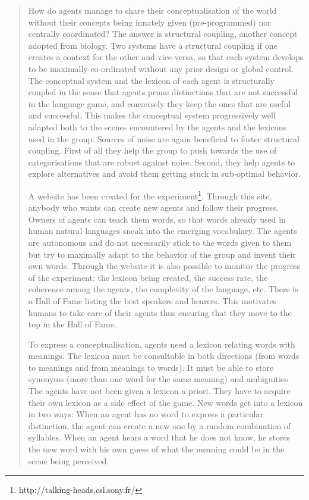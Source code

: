 \begin{quotation}
How do agents manage to share their conceptualisation of the world without their concepts being innately given (pre-programmed) nor centrally coordinated? The answer is structural coupling, another concept adopted from biology. Two systems have a structural coupling if one creates a context for the other and vice-versa, so that each system develops to be maximally co-ordinated without any prior design or global control. The conceptual system and the lexicon of each agent is structurally coupled in the sense that agents prune distinctions that are not successful in the language game, and conversely they keep the ones that are useful and successful. This makes the conceptual system progressively well adapted both to the scenes encountered by the agents and the lexicons used in the group. Sources of noise are again beneficial to foster structural coupling. First of all they help the group to push towards the use of categorisations that are robust against noise. Second, they help agents to explore alternatives and avoid them getting stuck in sub-optimal behavior.

A website has been created for the experiment\footnote{http://talking-heads.csl.sony.fr/}. Through this site, anybody who wants can create new agents and follow their progress. Owners of agents can teach them words, so that words already used in human natural languages sneak into the emerging vocabulary. The agents are autonomous and do not necessarily stick to the words given to them but try to maximally adapt to the behavior of the group and invent their own words. Through the website it is also possible to monitor the progress of the experiment: the lexicon being created, the success rate, the coherence among the agents, the complexity of the language, etc. There is a Hall of Fame listing the best speakers and hearers. This motivates humans to take care of their agents thus ensuring that they move to the top in the Hall of Fame.

To express a conceptualisation, agents need a lexicon relating words with meanings. The lexicon must be consultable in both directions (from words to meanings and from meanings to words). It must be able to store synonyms (more than one word for the same meaning) and ambiguities The agents have not been given a lexicon a priori. They have to acquire their own lexicon as a side effect of the game. New words get into a lexicon in two ways: When an agent has no word to express a particular distinction, the agent can create a new one by a random combination of syllables. When an agent hears a word that he does not know, he stores the new word with his own guess of what the meaning could be in the scene being perceived.


\end{quotation}
